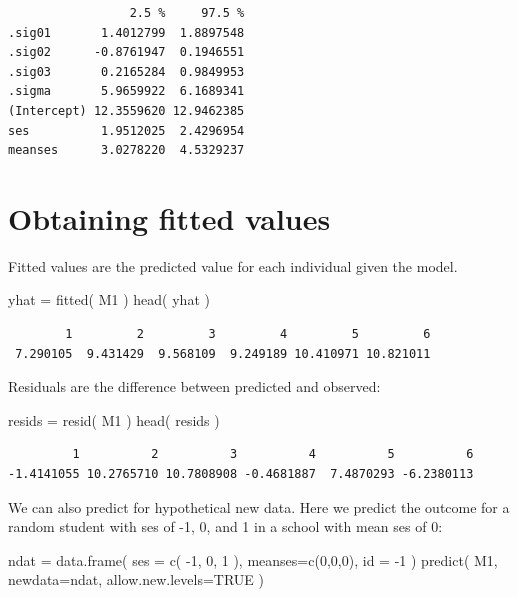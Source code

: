 \documentclass[
  letterpaper,
  DIV=11,
  numbers=noendperiod]{scrreprt}
\newenvironment{Shaded}{\begin{snugshade}}{\end{snugshade}}
\newcommand{\AttributeTok}[1]{\textcolor[rgb]{0.49,0.56,0.16}{#1}}
\newcommand{\ConstantTok}[1]{\textcolor[rgb]{0.53,0.00,0.00}{#1}}
\newcommand{\DecValTok}[1]{\textcolor[rgb]{0.25,0.63,0.44}{#1}}
\newcommand{\FunctionTok}[1]{\textcolor[rgb]{0.02,0.16,0.49}{#1}}
\newcommand{\NormalTok}[1]{\textcolor[rgb]{0.00,0.44,0.13}{#1}}
\newcommand{\OtherTok}[1]{\textcolor[rgb]{0.00,0.44,0.13}{#1}}
\newcommand{\SpecialCharTok}[1]{\textcolor[rgb]{0.25,0.44,0.63}{#1}}
\begin{document}
\begin{verbatim}
                 2.5 %     97.5 %
.sig01       1.4012799  1.8897548
.sig02      -0.8761947  0.1946551
.sig03       0.2165284  0.9849953
.sigma       5.9659922  6.1689341
(Intercept) 12.3559620 12.9462385
ses          1.9512025  2.4296954
meanses      3.0278220  4.5329237
\end{verbatim}

\hypertarget{obtaining-fitted-values}{%
\section{Obtaining fitted values}\label{obtaining-fitted-values}}

Fitted values are the predicted value for each individual given the
model.

\begin{Shaded}
\begin{Highlighting}[]
\NormalTok{yhat }\OtherTok{=} \FunctionTok{fitted}\NormalTok{( M1 )}
\FunctionTok{head}\NormalTok{( yhat )}
\end{Highlighting}
\end{Shaded}

\begin{verbatim}
        1         2         3         4         5         6 
 7.290105  9.431429  9.568109  9.249189 10.410971 10.821011 
\end{verbatim}

Residuals are the difference between predicted and observed:

\begin{Shaded}
\begin{Highlighting}[]
\NormalTok{resids }\OtherTok{=} \FunctionTok{resid}\NormalTok{( M1 )}
\FunctionTok{head}\NormalTok{( resids )}
\end{Highlighting}
\end{Shaded}

\begin{verbatim}
         1          2          3          4          5          6 
-1.4141055 10.2765710 10.7808908 -0.4681887  7.4870293 -6.2380113 
\end{verbatim}

We can also predict for hypothetical new data. Here we predict the
outcome for a random student with ses of -1, 0, and 1 in a school with
mean ses of 0:

\begin{Shaded}
\begin{Highlighting}[]
\NormalTok{ndat }\OtherTok{=} \FunctionTok{data.frame}\NormalTok{( }\AttributeTok{ses =} \FunctionTok{c}\NormalTok{( }\SpecialCharTok{{-}}\DecValTok{1}\NormalTok{, }\DecValTok{0}\NormalTok{, }\DecValTok{1}\NormalTok{ ), }\AttributeTok{meanses=}\FunctionTok{c}\NormalTok{(}\DecValTok{0}\NormalTok{,}\DecValTok{0}\NormalTok{,}\DecValTok{0}\NormalTok{), }\AttributeTok{id =} \SpecialCharTok{{-}}\DecValTok{1}\NormalTok{ )}
\FunctionTok{predict}\NormalTok{( M1, }\AttributeTok{newdata=}\NormalTok{ndat, }\AttributeTok{allow.new.levels=}\ConstantTok{TRUE}\NormalTok{ )}
\end{Highlighting}
\end{Shaded}
\end{document}
